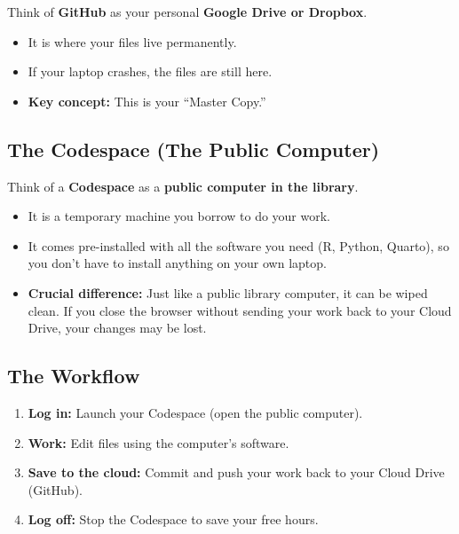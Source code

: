 \documentclass[
  letterpaper,
  DIV=11,
  numbers=noendperiod,
  oneside]{scrreprt}
\providecommand{\tightlist}{%
  \setlength{\itemsep}{0pt}\setlength{\parskip}{0pt}}
\begin{document}
Think of \textbf{GitHub} as your personal \textbf{Google Drive or
Dropbox}.

\begin{itemize}
\tightlist
\item
  It is where your files live permanently.
\item
  If your laptop crashes, the files are still here.
\item
  \textbf{Key concept:} This is your ``Master Copy.''
\end{itemize}

\subsection*{The Codespace (The Public
Computer)}\label{the-codespace-the-public-computer}

Think of a \textbf{Codespace} as a \textbf{public computer in the
library}.

\begin{itemize}
\tightlist
\item
  It is a temporary machine you borrow to do your work.
\item
  It comes pre-installed with all the software you need (R, Python,
  Quarto), so you don't have to install anything on your own laptop.
\item
  \textbf{Crucial difference:} Just like a public library computer, it
  can be wiped clean. If you close the browser without sending your work
  back to your Cloud Drive, your changes may be lost.
\end{itemize}

\subsection*{The Workflow}\label{the-workflow}

\begin{enumerate}
\def\labelenumi{\arabic{enumi}.}
\tightlist
\item
  \textbf{Log in:} Launch your Codespace (open the public computer).
\item
  \textbf{Work:} Edit files using the computer's software.
\item
  \textbf{Save to the cloud:} Commit and push your work back to your
  Cloud Drive (GitHub).
\item
  \textbf{Log off:} Stop the Codespace to save your free hours.
\end{enumerate}
\end{document}
